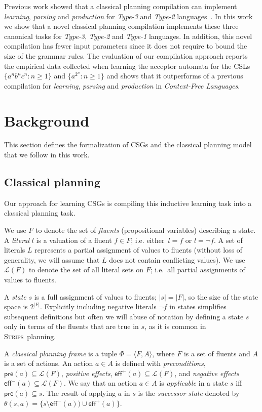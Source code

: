\documentclass[letterpaper]{article} %
\newcommand{\tup}[1]{{\langle #1 \rangle}}
\newcommand{\pre}{\mathsf{pre}}     %
\newcommand{\eff}{\mathsf{eff}}     %
\newcommand{\strips}{\textsc{Strips}}     %
\begin{document}
Previous work showed that a classical planning compilation can implement {\it learning}, {\it parsing} and {\it production} for {\em Type-3} and {\em Type-2} languages~\cite{segovia2017generating}. In this work we show that a novel classical planning compilation implements these three canonical tasks for {\em Type-3}, {\em Type-2} and {\em Type-1} languages. In addition, this novel compilation has fewer input parameters since it does not require to bound the size of the grammar rules. The evaluation of our compilation approach reports the empirical data collected when learning the acceptor automata for the CSLs $\{a^nb^nc^n : n \geq 1 \}$ and $\{a^{2^n} : n \geq 1 \}$ and shows that it outperforms of a previous compilation for {\it learning}, {\it parsing} and {\it production} in {\em Context-Free Languages}.



\section{Background}
This section defines the formalization of CSGs and the classical planning model that we follow in this work.

\subsection{Classical planning}
Our approach for learning CSGs is compiling this inductive learning task into a classical planning task.

We use $F$ to denote the set of {\em fluents} (propositional variables) describing a state. A {\em literal} $l$ is a valuation of a fluent $f\in F$; i.e. either~$l=f$ or $l=\neg f$. A set of literals $L$ represents a partial assignment of values to fluents (without loss of generality, we will assume that $L$ does not contain conflicting values). We use $\mathcal{L}(F)$ to denote the set of all literal sets on $F$; i.e.~all partial assignments of values to fluents.

A {\em state} $s$ is a full assignment of values to fluents; $|s|=|F|$, so the size of the state space is $2^{|F|}$. Explicitly including negative literals $\neg f$ in states simplifies subsequent definitions but often we will abuse of notation by defining a state $s$ only in terms of the fluents that are true in $s$, as it is common in \strips\ planning.

A {\em classical planning frame} is a tuple $\Phi=\tup{F,A}$, where $F$ is a set of fluents and $A$ is a set of actions. An action $a\in A$ is defined with {\em preconditions}, $\pre(a)\subseteq\mathcal{L}(F)$, {\em positive effects}, $\eff^+(a)\subseteq\mathcal{L}(F)$, and {\em negative effects} $\eff^-(a)\subseteq\mathcal{L}(F)$. We say that an action $a\in A$ is {\em applicable} in a state $s$ iff $\pre(a)\subseteq s$. The result of applying $a$ in $s$ is the {\em successor state} denoted by $\theta(s,a)=\{s\setminus\eff^-(a))\cup\eff^+(a)\}$.
\end{document}
